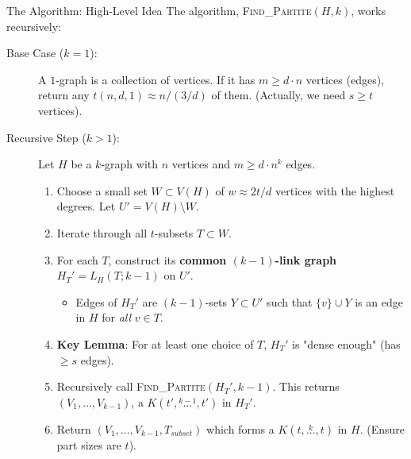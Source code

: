 \documentclass{beamer}
\newcommand{\compoverset}[2]{\ensuremath{K\left(#2, \overset{#1}{\dots}, #2\right)}} %
\newcommand{\link}[3]{\ensuremath{L_{#1}\left(#2; #3\right)}} %
\begin{document}
\begin{frame}{The Algorithm: High-Level Idea}
  The algorithm, \textsc{Find\_Partite}$(H, k)$, works recursively:
  \begin{description}
    \item[Base Case ($k=1$):]
      A $1$-graph is a collection of vertices. If it has $m \ge d \cdot n$ vertices (edges), return any $t(n,d,1) \approx n/ (3/d)$ of them. (Actually, we need $s \ge t$ vertices).
    \pause
    \item[Recursive Step ($k > 1$):]
      Let $H$ be a $k$-graph with $n$ vertices and $m \ge d \cdot n^k$ edges.
      \begin{enumerate}
        \item Choose a small set $W \subset V(H)$ of $w \approx 2t/d$ vertices with the highest degrees. Let $U' = V(H) \setminus W$.
        \pause
        \item Iterate through all $t$-subsets $T \subset W$.
        \pause
        \item For each $T$, construct its \textbf{common $(k-1)$-link graph} $H_T' = \link{H}{T}{k-1}$ on $U'$.
          \begin{itemize}
            \item Edges of $H_T'$ are $(k-1)$-sets $Y \subset U'$ such that $\{v\} \cup Y$ is an edge in $H$ for \emph{all} $v \in T$.
          \end{itemize}
        \pause
        \item \textbf{Key Lemma}: For at least one choice of $T$, $H_T'$ is "dense enough" (has $\ge s$ edges).
        \pause
        \item Recursively call \textsc{Find\_Partite}$(H_T', k-1)$. This returns $(V_1, \dots, V_{k-1})$, a $\compoverset{k-1}{t'}$ in $H_T'$.
        \pause
        \item Return $(V_1, \dots, V_{k-1}, T_{subset})$ which forms a $\compoverset{k}{t}$ in $H$. (Ensure part sizes are $t$).
      \end{enumerate}
  \end{description}
\end{frame}
\end{document}

